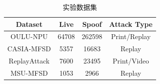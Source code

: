 \begin{table}[H]
\centering
\caption{实验数据集}
\begin{tabular}{cccc}
\toprule
Dataset & Live & Spoof & Attack Type \\
\midrule
OULU-NPU & 64708 & 262598 & Print/Replay \\
CASIA-MFSD & 5357 & 16683 & Replay \\
ReplayAttack & 7600 & 23495 & Print/Video \\
MSU-MFSD & 1053 & 2966 & Replay \\
\bottomrule
\end{tabular}
\label{tab:dataset}
\end{table}
